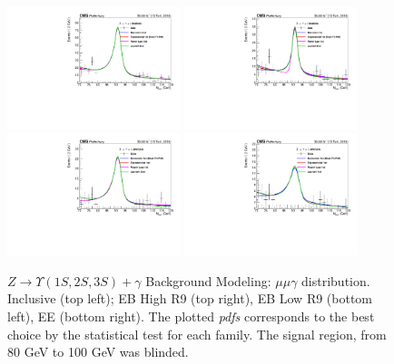 
\begin{figure}[!htbp]
\begin{center}
\includegraphics[width=0.45\textwidth]{figures_and_tables/fitPlotFiles2D/ftestOutput2D/outdir_ZToUpsilonPhoton_Cat0/bkgfTest-Data/mHZ_multipdf_UntaggedTag_0}\hspace*{1.cm}
\includegraphics[width=0.45\textwidth]{figures_and_tables/fitPlotFiles2D/ftestOutput2D/outdir_ZToUpsilonPhoton_Cat1/bkgfTest-Data/mHZ_multipdf_UntaggedTag_0}
\includegraphics[width=0.45\textwidth]{figures_and_tables/fitPlotFiles2D/ftestOutput2D/outdir_ZToUpsilonPhoton_Cat2/bkgfTest-Data/mHZ_multipdf_UntaggedTag_0}\hspace*{1.cm}
\includegraphics[width=0.45\textwidth]{figures_and_tables/fitPlotFiles2D/ftestOutput2D/outdir_ZToUpsilonPhoton_Cat3/bkgfTest-Data/mHZ_multipdf_UntaggedTag_0}
\end{center}\vspace*{-.5cm}
\caption{$Z \rightarrow \Upsilon(1S,2S,3S) +\gamma$ Background Modeling: $\mu\mu\gamma$ distribution. Inclusive (top left); EB High R9 (top right), EB Low R9 (bottom left), EE (bottom right). The plotted \textit{pdfs} corresponds to the best choice by the statistical test for each family. The signal region, from 80 GeV to 100 GeV was blinded.}
\label{fig:ZToUpsilon_mHZ_Projection}
\end{figure}


